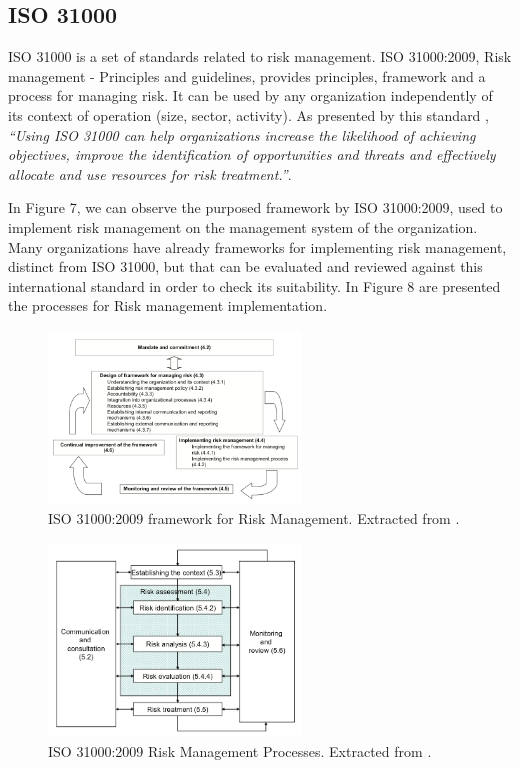 \subsection{ISO 31000}

ISO 31000 is a set of standards related to risk management. ISO 31000:2009, Risk management - Principles and guidelines, provides principles, framework and a process for managing risk. It can be used by any organization independently of its context of operation (size, sector, activity). As presented by this standard \cite{ISO31000}, \textit{``Using ISO 31000 can help organizations increase the likelihood of achieving objectives, improve the identification of opportunities and threats and effectively allocate and use resources for risk treatment.''}.\par
In Figure 7, we can observe the purposed framework by ISO 31000:2009, used to implement risk management on the management system of the organization. Many organizations have already frameworks for implementing risk management, distinct from ISO 31000, but that can be evaluated and reviewed against this international standard in order to check its suitability. In Figure 8 are presented the processes for Risk management implementation.\par

\begin{figure}[h!]
\centering
\includegraphics[width=0.6\textwidth]{img/ISO31000Framework.png}
\caption{ISO 31000:2009 framework for Risk Management. Extracted from \cite{ISO31000}.}
\end{figure}

\begin{figure}[h!]
\centering
\includegraphics[width=0.6\textwidth]{img/ISO31000RiskProcesses.png}
\caption{ISO 31000:2009 Risk Management Processes. Extracted from \cite{ISO31000}.}
\end{figure}

